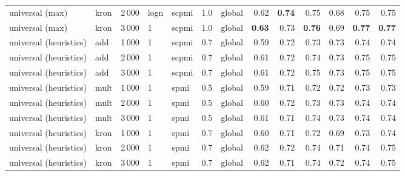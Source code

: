 \begin{tabular}{lllllllrrrrrr}
universal (max)        & kron & 2\,000 & logn  & scpmi & 1.0 & global &         0.62 &          \textbf{0.74} &           0.75 &            0.68 &             0.75 &        0.75 \\
universal (max)        & kron & 3\,000 & 1     & scpmi & 1.0 & global &         \textbf{0.63} &          0.73 &           \textbf{0.76} &            0.69 &             \textbf{0.77} &        \textbf{0.77} \\ \addlinespace
universal (heuristics) & add  & 1\,000 & 1     & scpmi & 0.7 & global &         0.59 &          0.72 &           0.73 &            0.73 &             0.74 &        0.74 \\
universal (heuristics) & add  & 2\,000 & 1     & scpmi & 0.7 & global &         0.61 &          0.72 &           0.74 &            0.73 &             0.75 &        0.75 \\
universal (heuristics) & add  & 3\,000 & 1     & scpmi & 0.7 & global &         0.61 &          0.72 &           0.75 &            0.73 &             0.75 &        0.75 \\ \addlinespace
universal (heuristics) & mult & 1\,000 & 1     & spmi  & 0.5 & global &         0.59 &          0.71 &           0.72 &            0.72 &             0.73 &        0.73 \\
universal (heuristics) & mult & 2\,000 & 1     & spmi  & 0.5 & global &         0.60 &          0.72 &           0.73 &            0.73 &             0.74 &        0.74 \\
universal (heuristics) & mult & 3\,000 & 1     & spmi  & 0.5 & global &         0.61 &          0.71 &           0.74 &            0.73 &             0.74 &        0.74 \\ \addlinespace
universal (heuristics) & kron & 1\,000 & 1     & spmi  & 0.7 & global &         0.60 &          0.71 &           0.72 &            0.69 &             0.73 &        0.74 \\
universal (heuristics) & kron & 2\,000 & 1     & spmi  & 0.7 & global &         0.62 &          0.72 &           0.74 &            0.71 &             0.74 &        0.75 \\
universal (heuristics) & kron & 3\,000 & 1     & spmi  & 0.7 & global &         0.62 &          0.71 &           0.74 &            0.72 &             0.74 &        0.75 \\
\bottomrule
\end{tabular}
